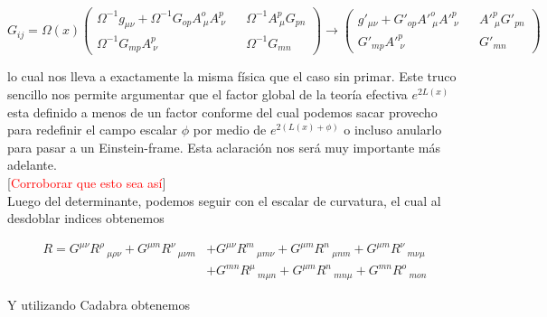 \documentclass{article}
\numberwithin{equation}{section}
\begin{document}
\begin{equation}\label{Gconforme}
G_{i j} =
\Omega(x) \begin{pmatrix}
\Omega^{-1} g_{\mu \nu} + \Omega^{-1} G_{o p} A^o_{\ \mu} A^p_{\ \nu} &&  \Omega^{-1}A^p_{\ \mu} G_{p n}\\
\Omega^{-1} G_{m p} A^p_{\ \nu}  && \Omega^{-1} G_{m n}
\end{pmatrix} 
\longrightarrow 
\begin{pmatrix}
g'_{\mu \nu} + G'_{o p} A'^o_{\ \mu} A'^p_{\ \nu} &&  A'^p_{\ \mu} G'_{p n}\\
G'_{m p} A'^p_{\ \nu}  && G'_{m n}
\end{pmatrix} 
\end{equation}

lo cual nos lleva a exactamente la misma física que el caso sin primar. Este truco sencillo nos permite argumentar que el factor global de la teoría efectiva $ e^{2 L(x)} $ esta definido a menos de un factor conforme del cual podemos sacar provecho para redefinir el campo escalar $ \phi $ por medio de $ e^{2 \left(L(x) + \phi \right)} $ o incluso anularlo para pasar a un Einstein-frame. Esta aclaración nos será muy importante más adelante.\\

[\textcolor{red}{Corroborar que esto sea así}]\\


Luego del determinante, podemos seguir con el escalar de curvatura, el cual al desdoblar indices obtenemos

\begin{equation}
\begin{aligned}
R= G^{\mu \nu} R^{\rho}\,_{\mu \rho \nu}+G^{\mu m} R^{\nu}\,_{\mu \nu m}&+G^{\mu \nu} R^{m}\,_{\mu m \nu}+G^{\mu m} R^{n}\,_{\mu n m}+G^{\mu m} R^{\nu}\,_{m \nu \mu}\\
&+G^{m n} R^{\mu}\,_{m \mu n}+G^{\mu m} R^{n}\,_{m n \mu}+G^{m n} R^{o}\,_{m o n}
\end{aligned}
\end{equation}

Y utilizando Cadabra obtenemos
\end{document}
